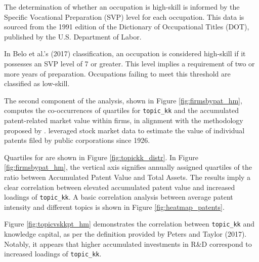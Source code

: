 \documentclass[12pt, letterpaper]{article}
\begin{document}
The determination of whether an occupation is high-skill is informed by the Specific Vocational Preparation (SVP) level for each occupation. This data is sourced from the 1991 edition of the Dictionary of Occupational Titles (DOT), published by the U.S. Department of Labor. 

In Belo et al.'s (2017) classification, an occupation is considered high-skill if it possesses an SVP level of 7 or greater. This level implies a requirement of two or more years of preparation. Occupations failing to meet this threshold are classified as low-skill.


The second component of the analysis, shown in Figure \ref{fig:firmsbypat_hm}, computes the co-occurrences of quartiles for \texttt{topic\_kk} and the accumulated patent-related market value within firms, in alignment with the methodology proposed by \cite{Kogan2017-fx}. \cite{Kogan2017-fx} leveraged stock market data to estimate the value of individual patents filed by public corporations since 1926. 

 Quartiles for \tkk are shown in Figure \ref{fig:topickk_distr}. In Figure \ref{fig:firmsbypat_hm}, the vertical axis signifies annually assigned quartiles of the ratio between Accumulated Patent Value and Total Assets. The results imply a clear correlation between elevated accumulated patent value and increased loadings of \texttt{topic\_kk}. A basic correlation analysis between average patent intensity and different topics is shown in Figure \ref{fig:heatmap_patents}.




Figure \ref{fig:topicvskkpt_hm} demonstrates the correlation between \texttt{topic\_kk} and knowledge capital, as per the definition provided by Peters and Taylor (2017). Notably, it appears that higher accumulated investments in R\&D correspond to increased loadings of \texttt{topic\_kk}. 
\end{document}
